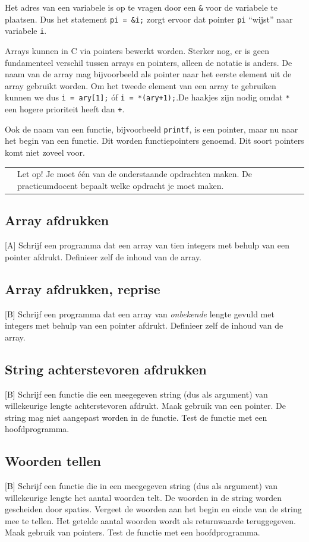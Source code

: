 \documentclass[a4paper,10pt,fleqn,twoside]{article}
\newcommand{\letop}{%
\vspace{4ex plus 1ex minus 1ex}
\begin{mdframed}[outerlinewidth = 1 ,%
roundcorner = 4 pt,%
leftmargin = 40,%
rightmargin = 40,%
backgroundcolor = yellow!40,%
outerlinecolor = red!70!black,%
innertopmargin = \topskip,%
splittopskip = \topskip,%
]
\begin{tabularx}{\linewidth}{m{1cm}X}
\Large\leftpointright & Let op! Je moet één van de onderstaande opdrachten maken. De practicumdocent bepaalt welke opdracht je moet maken.
\end{tabularx}
\end{mdframed}
\vspace{4ex plus 1ex minus 1ex}
}
\begin{document}
Het adres van een variabele is op te vragen door een \lstinline|&| voor de variabele te plaatsen. Dus het statement \lstinline|pi = &i;| zorgt ervoor dat pointer \lstinline|pi| ``wijst'' naar variabele \lstinline|i|.

Arrays kunnen in C via pointers bewerkt worden. Sterker nog, er is geen fundamenteel verschil tussen arrays en pointers, alleen de notatie is anders. De naam van de array mag bijvoorbeeld als pointer naar het eerste element uit de array gebruikt worden. Om het tweede element van een array te gebruiken kunnen we dus \lstinline|i = ary[1];| óf \lstinline|i = *(ary+1);|.De haakjes zijn nodig omdat \lstinline|*| een hogere prioriteit heeft dan \lstinline|+|.

Ook de naam van een functie, bijvoorbeeld \lstinline|printf|, is een pointer, maar nu naar het begin van een functie. Dit worden functiepointers genoemd. Dit soort pointers komt niet zoveel voor.

\letop

\subsection{Array afdrukken}[A]
Schrijf een programma dat een array van tien integers met behulp van een pointer afdrukt. Definieer zelf de inhoud van de array.

\subsection{Array afdrukken, reprise}[B]
Schrijf een programma dat een array van \textsl{onbekende} lengte gevuld met integers met behulp van een pointer afdrukt. Definieer zelf de inhoud van de array.

\subsection{String achterstevoren afdrukken}[B]
Schrijf een functie die een meegegeven string (dus als argument) van willekeurige lengte achterstevoren afdrukt. Maak gebruik van een pointer. De string mag niet aangepast worden in de functie. Test de functie met een hoofdprogramma.

\subsection{Woorden tellen}[B]
Schrijf een functie die in een meegegeven string (dus als argument) van willekeurige lengte het aantal woorden telt. De woorden in de string worden gescheiden door spaties. Vergeet de woorden aan het begin en einde van de string mee te tellen. Het getelde aantal woorden wordt als returnwaarde teruggegeven. Maak gebruik van pointers. Test de functie met een hoofdprogramma.
\end{document}
